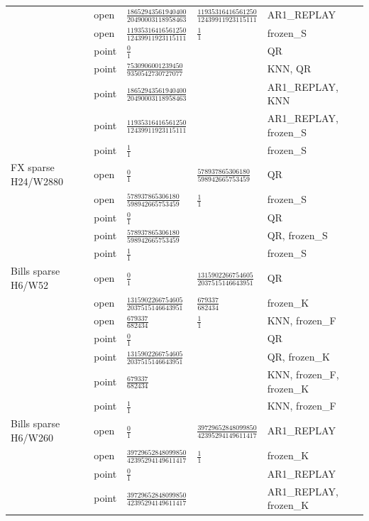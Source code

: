 \documentclass[11pt,a4paper]{article}
\begin{document}
\begin{longtable}{p{28mm}p{10mm}p{39mm}p{39mm}p{28mm}}
 & open & \(\frac{18652943561940400}{20490003118958463}\) & \(\frac{11935316416561250}{12439911923115111}\) & AR1\_REPLAY \\
 & open & \(\frac{11935316416561250}{12439911923115111}\) & \(\frac{1}{1}\) & frozen\_S \\
 & point & \(\frac{0}{1}\) &  & QR \\
 & point & \(\frac{7530906001239450}{9350542730727077}\) &  & KNN, QR \\
 & point & \(\frac{18652943561940400}{20490003118958463}\) &  & AR1\_REPLAY, KNN \\
 & point & \(\frac{11935316416561250}{12439911923115111}\) &  & AR1\_REPLAY, frozen\_S \\
 & point & \(\frac{1}{1}\) &  & frozen\_S \\
FX sparse H24/W2880 & open & \(\frac{0}{1}\) & \(\frac{578937865306180}{598942665753459}\) & QR \\
 & open & \(\frac{578937865306180}{598942665753459}\) & \(\frac{1}{1}\) & frozen\_S \\
 & point & \(\frac{0}{1}\) &  & QR \\
 & point & \(\frac{578937865306180}{598942665753459}\) &  & QR, frozen\_S \\
 & point & \(\frac{1}{1}\) &  & frozen\_S \\
Bills sparse H6/W52 & open & \(\frac{0}{1}\) & \(\frac{1315902266754605}{2037515146643951}\) & QR \\
 & open & \(\frac{1315902266754605}{2037515146643951}\) & \(\frac{679337}{682434}\) & frozen\_K \\
 & open & \(\frac{679337}{682434}\) & \(\frac{1}{1}\) & KNN, frozen\_F \\
 & point & \(\frac{0}{1}\) &  & QR \\
 & point & \(\frac{1315902266754605}{2037515146643951}\) &  & QR, frozen\_K \\
 & point & \(\frac{679337}{682434}\) &  & KNN, frozen\_F, frozen\_K \\
 & point & \(\frac{1}{1}\) &  & KNN, frozen\_F \\
Bills sparse H6/W260 & open & \(\frac{0}{1}\) & \(\frac{39729652848099850}{42395294149611417}\) & AR1\_REPLAY \\
 & open & \(\frac{39729652848099850}{42395294149611417}\) & \(\frac{1}{1}\) & frozen\_K \\
 & point & \(\frac{0}{1}\) &  & AR1\_REPLAY \\
 & point & \(\frac{39729652848099850}{42395294149611417}\) &  & AR1\_REPLAY, frozen\_K \\

\end{longtable}
\end{document}
